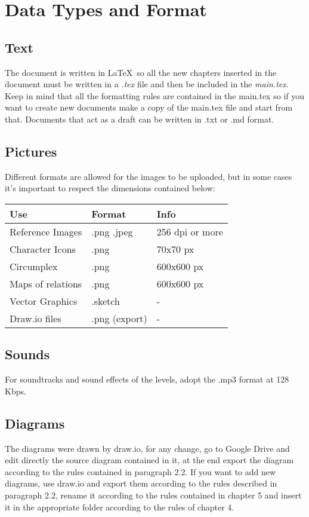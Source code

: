 \section{Data Types and Format}

\subsection{Text}
The document is written in \LaTeX\ so all the new chapters inserted in the document must be written in a \textit{.tex} file and then be included in the \textit{main.tex}. Keep in mind that all the formatting rules are contained in the main.tex so if you want to create new documents make a copy of the main.tex file and start from that. Documents that act as a draft can be written in .txt or .md format.

\subsection{Pictures}
Different formats are allowed for the images to be uploaded, but in some cases it's important to respect the dimensions contained below:

\begin{center}
	\begin{tabular}[c]{| p{8cm} | p{3cm} | p{3cm} |}
		\hline
		\textbf{Use} & \textbf{Format}  & \textbf{Info}\\
		\hline
		Reference Images & .png .jpeg & 256 dpi or more \\
		\hline
		Character Icons & .png & 70x70 px\\
		\hline
		Circumplex & .png & 600x600 px \\
		\hline
		Maps of relations & .png & 600x600 px \\
		\hline
		Vector Graphics & .sketch & - \\
		\hline
		Draw.io files & .png (export) & - \\
		\hline
	\end{tabular}
\end{center}

\subsection{Sounds}
For soundtracks and sound effects of the levels, adopt the .mp3 format at 128 Kbps.

\subsection{Diagrams}
The diagrams were drawn by draw.io, for any change, go to Google Drive and edit directly the source diagram contained in it, at the end export the diagram according to the rules contained in paragraph 2.2. If you want to add new diagrams, use draw.io and export them according to the rules described in paragraph 2.2, rename it according to the rules contained in chapter 5 and insert it in the appropriate folder according to the rules of chapter 4.


